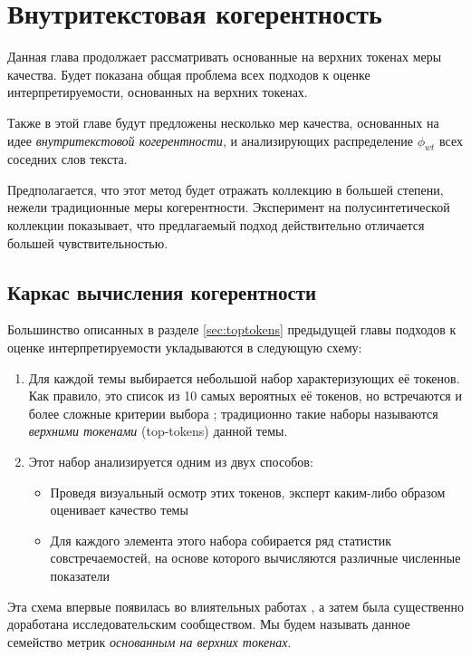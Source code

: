 \chapter{Внутритекстовая когерентность}
\label{chap:coh}

Данная глава продолжает рассматривать основанные на верхних токенах
меры качества. Будет показана общая проблема всех подходов к оценке интерпретируемости, основанных на верхних токенах.

Также в этой главе будут предложены несколько мер качества, основанных на идее \textit{внутритекстовой когерентности}, и анализирующих распределение $\phi_{wt}$ всех соседних слов текста.

Предполагается, что этот метод будет отражать коллекцию в большей степени, нежели традиционные меры когерентности. Эксперимент на полусинтетической коллекции показывает, что предлагаемый подход действительно отличается большей чувствительностью.

\section{Каркас вычисления когерентности}

Большинство описанных в разделе \ref{sec:toptokens} предыдущей главы подходов к оценке интерпретируемости укладываются в следующую схему:

\begin{enumerate}
    \item Для каждой темы выбирается небольшой набор характеризующих её токенов. Как правило, это список из 10 самых вероятных её токенов, но встречаются и более сложные критерии выбора \cite{Blei_lafferty,ldavis2014,boydcare,frex}; традиционно такие наборы называются \textit{верхними токенами} (top-tokens) данной темы.

    \item{Этот набор анализируется одним из двух способов:
    \begin{itemize}	
        \item Проведя визуальный осмотр этих токенов, эксперт каким-либо образом оценивает качество темы
        \item Для каждого элемента этого набора собирается ряд статистик совстречаемостей, на основе которого вычисляются различные численные показатели
    \end{itemize}
    }
\end{enumerate}

Эта схема впервые появилась во влиятельных работах \cite{rtl,mrtl,newman2010automatic,mimno2011}, а затем была существенно доработана исследовательским сообществом. Мы будем называть данное семейство метрик \textit{основанным на верхних токенах}.

